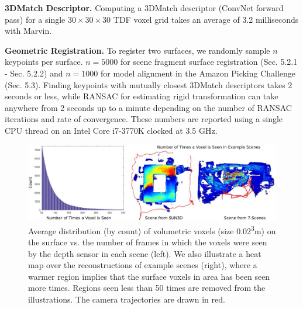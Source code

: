 \documentclass[10pt,twocolumn,letterpaper]{article}
\begin{document}

\noindent\textbf{3DMatch Descriptor.} Computing a 3DMatch descriptor (\eg ConvNet forward pass) for a single $30 \times 30 \times 30$ TDF voxel grid takes an average of 3.2 milliseconds with Marvin.

\noindent\textbf{Geometric Registration.} To register two surfaces, we randomly sample $n$ keypoints per surface. $n = 5000$ for scene fragment surface registration (Sec. 5.2.1 - Sec. 5.2.2) and $n = 1000$ for model alignment in the Amazon Picking Challenge (Sec. 5.3). Finding keypoints with mutually closest 3DMatch descriptors takes 2 seconds or less, while RANSAC for estimating rigid transformation can take anywhere from 2 seconds up to a minute depending on the number of RANSAC iterations and rate of convergence. These numbers are reported using a single CPU thread on an Intel Core i7-3770K clocked at 3.5 GHz.

\begin{figure}
\centering
\includegraphics[width=0.95\linewidth]{images/dataset-plot.jpg}
\caption{Average distribution (by count) of volumetric voxels (size 0.02\textsuperscript{3}m) on the surface vs. the number of frames in which the voxels were seen by the depth sensor in each scene (left). We also illustrate a heat map over the reconstructions of example scenes (right), where a warmer region implies that the surface voxels in area has been seen more times. Regions seen less than 50 times are removed from the illustrations. The camera trajectories are drawn in red.}
\label{fig:dataset-plot}
\end{figure}
\end{document}
